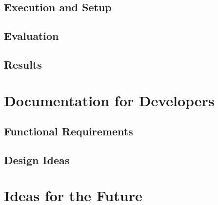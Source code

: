 \documentclass[11pt]{report}
\begin{document}
\subsection{Execution and Setup}

\subsection{Evaluation}

\subsection{Results}

\section{Documentation for Developers}

\subsection{Functional Requirements}

\subsection{Design Ideas}

\section{Ideas for the Future}

\printbibliography
\end{document}

